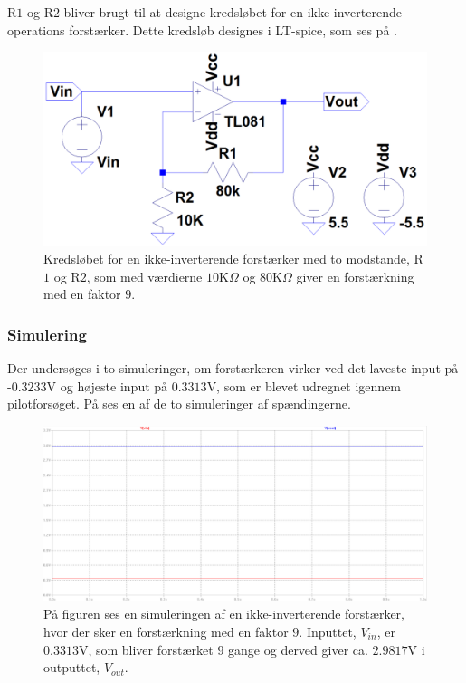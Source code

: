 \noindent R$1$ og R$2$ bliver brugt til at designe kredsløbet for en ikke-inverterende operations forstærker. Dette kredsløb designes i LT-spice, som ses på . 
\begin{figure}[H]
\centering
\includegraphics[scale=0.3]{figures/cProblemloesning/Forstaerker_faktor18.PNG}
\caption{Kredsløbet for en ikke-inverterende forstærker med to modstande, R$1$ og R$2$, som med værdierne $10$K$\Omega$ og $80$K$\Omega$ giver en forstærkning med en faktor $9$.}
\label{fig:Forstaerker_faktor18}
\end{figure} 

\subsubsection{Simulering}\label{Subsec:Forstaerker_simu}
Der undersøges i to simuleringer, om forstærkeren virker ved det laveste input på -$0.3233$V og højeste input på $0.3313$V, som er blevet udregnet igennem pilotforsøget. På  ses en af de to simuleringer af spændingerne.

\begin{figure}[H]
\centering
\includegraphics[scale=0.3]{figures/cProblemloesning/Forstaerker_faktor18_simulering.PNG}
\caption{På figuren ses en simuleringen af en ikke-inverterende forstærker, hvor der sker en forstærkning med en faktor $9$. Inputtet, $V_{in}$, er $0.3313$V, som bliver forstærket $9$ gange og derved giver ca. $2.9817$V i outputtet, $V_{out}$.}
\label{fig:Forstaerker_faktor18_simulering}
\end{figure}

